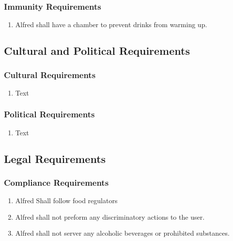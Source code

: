 \documentclass [11pt]{article}
\begin{document}
\subsubsection{Immunity Requirements  }
	\begin{enumerate}[label=\textbf{(\roman*)}]
		\item Alfred shall have a chamber to prevent drinks from warming up.
	\end{enumerate}

\subsection{Cultural and Political Requirements } 

\subsubsection{Cultural Requirements }
	\begin{enumerate}[label=\textbf{(\roman*)}]
		\item Text
	\end{enumerate}

\subsubsection{Political Requirements }
	\begin{enumerate}[label=\textbf{(\roman*)}]
		\item Text
	\end{enumerate}

\subsection{Legal Requirements}

\subsubsection{Compliance Requirements }
	\begin{enumerate}[label=\textbf{(\roman*)}]
		\item Alfred Shall follow food regulators
		\item Alfred shall not preform any discriminatory actions to the user.
		\item Alfred shall not server any alcoholic beverages or prohibited substances.
	\end{enumerate}
\end{document}
